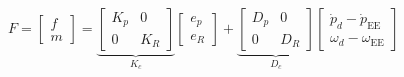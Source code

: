\documentclass[border=3pt]{standalone}
\begin{document}
{\fontsize{22}{27}\selectfont \color{black}$\displaystyle
F=\begin{bmatrix}f\\m\end{bmatrix}
=\underbrace{\begin{bmatrix}K_p&\mathrm{0}\\\mathrm{0}&K_R\end{bmatrix}}_{K_c}
\begin{bmatrix}e_p\\e_R\end{bmatrix}
+\underbrace{\begin{bmatrix}D_p&\mathrm{0}\\\mathrm{0}&D_R\end{bmatrix}}_{D_c}
\begin{bmatrix}\dot p_d-\dot p_{\mathrm{EE}}\\\omega_d-\omega_{\mathrm{EE}}\end{bmatrix}$}
\end{document}
